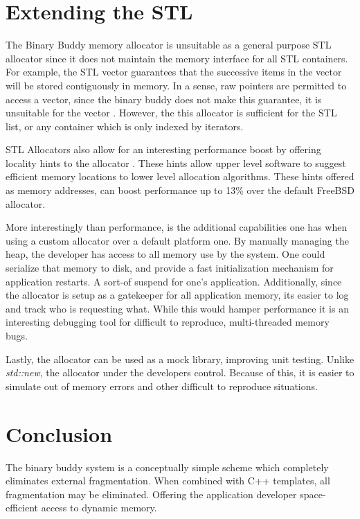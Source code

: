 \documentclass[12pt]{article}
\begin{document}
\section{Extending the STL}
The Binary Buddy memory allocator is unsuitable as a general purpose STL
allocator since it does not maintain the memory interface for all STL
containers. For example, the STL vector guarantees that the successive items in
the vector will be stored contiguously in memory. In a sense, raw pointers are
permitted to access a vector, since the binary buddy does not make this
guarantee, it is unsuitable for the vector \cite[p.~727]{cppstl}. However, the
this allocator is sufficient for the STL list, or any container which is only
indexed by iterators.

STL Allocators also allow for an interesting
performance boost by offering locality hints to the allocator \cite[p.~733]{cppstl}.
These hints allow upper level software to suggest efficient memory locations to
lower level allocation algorithms.  These hints offered as memory addresses, can
boost performance up to 13\% over the default FreeBSD allocator\cite{locality}.

More interestingly than performance, is the additional capabilities one has when
using a custom allocator over a default platform one.  By manually managing the
heap, the developer has access to all memory use by the system. One could
serialize that memory to disk, and provide a fast initialization mechanism for
application restarts.  A sort-of suspend for one's application.  
Additionally, since the allocator is setup as a gatekeeper
for all application memory, its easier to log and track who is requesting what.
While this would hamper performance it is an interesting debugging tool for
difficult to reproduce, multi-threaded memory bugs.

Lastly, the allocator can be used as a mock library, improving unit testing.
Unlike {\em std::new}, the allocator under the developers control. Because of
this, it is easier to simulate out of memory errors and other difficult to reproduce
situations.  

\section{Conclusion}
The binary buddy system is a conceptually simple scheme which completely
eliminates external fragmentation.  When combined with C++ templates, all
fragmentation may be eliminated.  Offering the application developer 
space-efficient access to dynamic memory.
\end{document}
